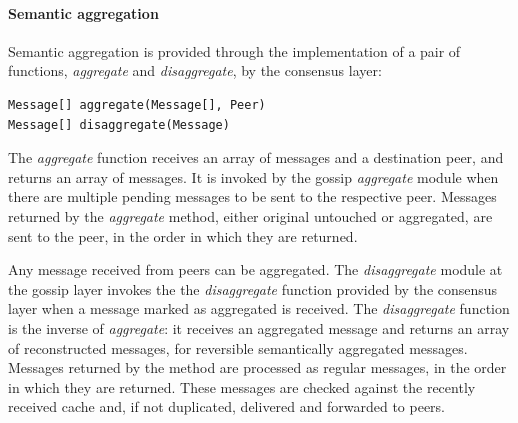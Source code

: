 \paragraph{Semantic aggregation} Semantic aggregation is provided through the implementation of a pair of
functions, {\em aggregate} and {\em disaggregate}, by the consensus layer:

\begin{verbatim}
Message[] aggregate(Message[], Peer)
Message[] disaggregate(Message)
\end{verbatim}

The {\em aggregate} function receives an array of messages and a destination
peer, and returns an array of messages.
It is invoked by the gossip {\em aggregate} module when there are multiple pending messages to be sent to the respective peer.
%
%
Messages returned by the {\em aggregate} method, either original untouched or 
aggregated, are sent to the peer, in the order in which they are returned.

Any message received from peers can be aggregated.  
The {\em disaggregate} module at the gossip layer invokes the 
the {\em disaggregate} function provided by the consensus layer when a message marked as
aggregated is received.
The {\em disaggregate} function 
is the inverse of {\em aggregate}: it receives an aggregated message and returns an array of reconstructed messages, for reversible semantically aggregated
messages.
Messages returned by the method are processed as regular messages, in the order
in which they are returned.
These messages are checked against the recently received
cache and, if not duplicated, delivered and forwarded to peers.


